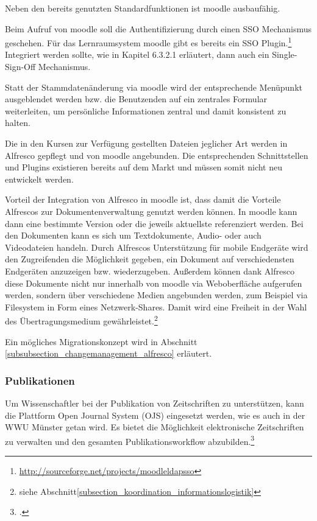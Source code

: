 {{Neben den bereits genutzten Standardfunktionen ist moodle ausbaufähig.

Beim Aufruf von moodle soll die Authentifizierung durch einen SSO Mechanismus geschehen. Für das Lernraumsystem moodle gibt es bereits ein SSO Plugin.\footnote{\url{http://sourceforge.net/projects/moodleldapsso}} Integriert werden sollte, wie in Kapitel 6.3.2.1 erläutert, dann auch ein Single-Sign-Off Mechanismus.

Statt der Stammdatenänderung via moodle wird der entsprechende Menüpunkt ausgeblendet werden bzw. die Benutzenden auf ein zentrales Formular weiterleiten, um persönliche Informationen zentral und damit konsistent zu halten.

Die in den Kursen zur Verfügung gestellten Dateien jeglicher Art werden in Alfresco gepflegt und von moodle angebunden. Die entsprechenden Schnittstellen und Plugins existieren bereits auf dem Markt und müssen somit nicht neu entwickelt werden.

Vorteil der Integration von Alfresco in moodle ist, dass damit die Vorteile Alfrescos zur Dokumentenverwaltung genutzt werden können. In moodle kann dann eine bestimmte Version oder die jeweils aktuellste referenziert werden. Bei den Dokumenten kann es sich um Textdokumente, Audio- oder auch Videodateien handeln. Durch Alfrescos Unterstützung für mobile Endgeräte wird den Zugreifenden die Möglichkeit gegeben, ein Dokument auf verschiedensten Endgeräten anzuzeigen bzw. wiederzugeben. Außerdem können dank Alfresco diese Dokumente nicht nur innerhalb von moodle via Weboberfläche aufgerufen werden, sondern über verschiedene Medien angebunden werden, zum Beispiel via Filesystem in Form eines Netzwerk-Shares. 
Damit wird eine Freiheit in der Wahl des Übertragungsmedium gewährleistet.\footnote{siehe Abschnitt\ref{subsection_koordination_informationslogistik}}

Ein mögliches Migrationskonzept wird in Abschnitt \ref{subsubsection_changemanagement_alfresco} erläutert.

\subsubsection{Publikationen}
Um Wissenschaftler bei der Publikation von Zeitschriften zu unterstützen, kann die Plattform Open Journal System (OJS) eingesetzt werden, wie es auch in der WWU Münster getan wird. Es bietet die Möglichkeit elektronische Zeitschriften zu verwalten und den gesamten Publikationsworkflow abzubilden.\footcite[Vgl.][48]{vogl_fortschritte_2012}

}}
